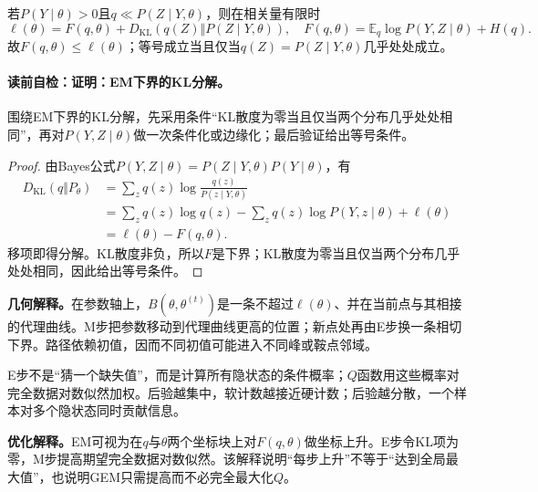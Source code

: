 \label{struct:V3-C04-CH12}
\begin{theorem}[EM下界的KL分解]\label{thm:V3-C04-lower-bound}
若$P(Y\mid\theta)>0$且$q\ll P(Z\mid Y,\theta)$，则在相关量有限时
\[
\ell(\theta)=F(q,\theta)+D_{\mathrm{KL}}
\!\left(q(Z)\Vert P(Z\mid Y,\theta)\right),
\quad F(q,\theta)=\mathbb E_q\log P(Y,Z\mid\theta)+H(q).
\]
故$F(q,\theta)\leq\ell(\theta)$；等号成立当且仅当$q(Z)=P(Z\mid Y,\theta)$几乎处处成立。
\end{theorem}

\label{struct:V3-C04-CH13}
\paragraph{读前自检：证明：EM下界的KL分解。}围绕EM下界的KL分解，先采用条件“KL散度为零当且仅当两个分布几乎处处相同”，再对$P(Y,Z\mid\theta)$做一次条件化或边缘化；最后验证给出等号条件。\par

\begin{proof}
由Bayes公式$P(Y,Z\mid\theta)=P(Z\mid Y,\theta)P(Y\mid\theta)$，有
\[
\begin{aligned}
D_{\mathrm{KL}}(q\Vert P_\theta)
&=\sum_zq(z)\log\frac{q(z)}{P(z\mid Y,\theta)}\\
&=\sum_zq(z)\log q(z)-\sum_zq(z)\log P(Y,z\mid\theta)+\ell(\theta)\\
&=\ell(\theta)-F(q,\theta).
\end{aligned}
\]
移项即得分解。KL散度非负，所以$F$是下界；KL散度为零当且仅当两个分布几乎处处相同，因此给出等号条件。
\end{proof}

\label{struct:V3-C04-CH14}
\begin{geometrybox}
\textbf{几何解释。}在参数轴上，$B(\theta,\theta^{(t)})$是一条不超过$\ell(\theta)$、并在当前点与其相接的代理曲线。M步把参数移动到代理曲线更高的位置；新点处再由E步换一条相切下界。路径依赖初值，因而不同初值可能进入不同峰或鞍点邻域。
\end{geometrybox}

\label{struct:V3-C04-CH15}
\begin{probabilitybox}
E步不是“猜一个缺失值”，而是计算所有隐状态的条件概率；$Q$函数用这些概率对完全数据对数似然加权。后验越集中，软计数越接近硬计数；后验越分散，一个样本对多个隐状态同时贡献信息。
\end{probabilitybox}

\label{struct:V3-C04-CH16}
\begin{optimizationbox}
\textbf{优化解释。}EM可视为在$q$与$\theta$两个坐标块上对$F(q,\theta)$做坐标上升。E步令KL项为零，M步提高期望完全数据对数似然。该解释说明“每步上升”不等于“达到全局最大值”，也说明GEM只需提高而不必完全最大化$Q$。
\end{optimizationbox}


